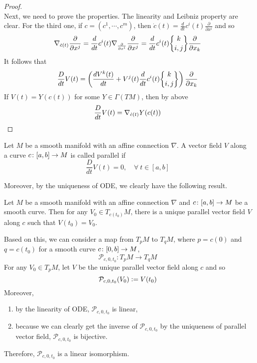 \begin{proof}
\begin{equation*}
	\end{equation*}
	Next, we need to prove the properties. The linearity and Leibniz property are clear. For the third one, if $c = (c^1,\cdots,c^m)$, then $\dot{c}(t) = \frac{d}{dt}c^i(t)\frac{\partial}{\partial x^i}$ and so
	\begin{equation*}
		\nabla_{\dot{c}(t)} \frac{\partial}{\partial x^j} = \frac{d}{dt}c^i(t) \nabla_{\frac{\partial}{\partial x^i}} \frac{\partial}{\partial x^j} =\frac{d}{dt}c^i(t) \bracenom{k}{i,j}\frac{\partial}{\partial x_k}
	\end{equation*}
	It follows that
	\begin{equation*}
		\frac{D}{dt}V(t) = \bc{ \frac{dV^k(t)}{dt} + V^j(t)\frac{d}{dt}c^i(t) \bracenom{k}{i,j}}\frac{\partial}{\partial x_k}
	\end{equation*}
	If $V(t) = Y(c(t))$ for some $Y \in \Gamma(TM)$, then by above
	\begin{equation*}
		\frac{D}{dt}V(t) = \nabla_{\dot{c}(t)}Y(c(t)) \qedhere
	\end{equation*}
\end{proof}

\begin{defn}
	Let $M$ be a smooth manifold with an affine connection $\nabla$. A vector field $V$ along a curve $c \colon [a,b] \rightarrow M$ is called parallel if 
	\begin{equation*}
		\frac{D}{dt}V(t) = 0,\quad \forall~t \in [a,b]
	\end{equation*}
\end{defn}

\noindent Moreover, by the uniqueness of ODE, we clearly have the following result.
\begin{prop}
	Let $M$ be a smooth manifold with an affine connection $\nabla$ and $c \colon [a,b] \rightarrow M$ be a smooth curve. Then for any $V_0 \in T_{c(t_0)}M$, there is a unique parallel vector field $V$ along $c$ such that $V(t_0) = V_0$.
\end{prop}

\noindent Based on this, we can consider a map from $T_pM$ to $T_qM$, where $p = c(0)$ and $q = c(t_0)$ for a smooth curve $c \colon [0,b] \rightarrow M$,
\begin{equation*}
	\mathcal{P}_{c,0,t_0} \colon T_pM \longrightarrow T_qM
\end{equation*}
For any $V_0 \in T_pM$, let $V$ be the unique parallel vector field along $c$ and so
\begin{equation*}
	\mathcal{P}_{c,0,t_0}(V_0) \vcentcolon= V(t_0)
\end{equation*}
Moreover,
\begin{enumerate}[label=(\arabic{*})]
	\item by the linearity of ODE, $\mathcal{P}_{c,0,t_0}$ is linear,
	\item because we can clearly get the inverse of $\mathcal{P}_{c,0,t_0}$ by the uniqueness of parallel vector field, $\mathcal{P}_{c,0,t_0}$ is bijective.
\end{enumerate}
Therefore, $\mathcal{P}_{c,0,t_0}$ is a linear isomorphism.

